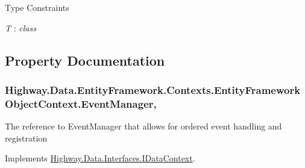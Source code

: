 \begin{Desc}
\item[Type Constraints]\begin{description}
\item[{\em T} : {\em class}]\end{description}
\end{Desc}


\subsection{Property Documentation}
\hypertarget{class_highway_1_1_data_1_1_entity_framework_1_1_contexts_1_1_entity_framework_object_context_a2342a28fa33d6cae0ce58c5f74438e9a}{
\subsubsection[{Event\-Manager}]{ Highway.\-Data.\-Entity\-Framework.\-Contexts.\-Entity\-Framework\-Object\-Context.\-Event\-Manager\hspace{0.3cm}{\ttfamily [get]}, {\ttfamily [set]}}}\label{class_highway_1_1_data_1_1_entity_framework_1_1_contexts_1_1_entity_framework_object_context_a2342a28fa33d6cae0ce58c5f74438e9a}


The reference to Event\-Manager that allows for ordered event handling and registration 



Implements \hyperlink{interface_highway_1_1_data_1_1_interfaces_1_1_i_data_context_a66d20c659a7c50d08705534ad750e1f8}{Highway.\-Data.\-Interfaces.\-I\-Data\-Context}.




